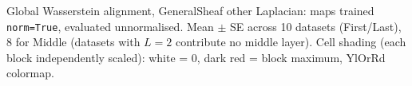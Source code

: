 \begin{table}[H]
\begin{minipage}{0.085\textwidth}
\end{minipage}
\caption{Global Wasserstein alignment, GeneralSheaf other Laplacian: maps trained \texttt{norm=True}, evaluated unnormalised. Mean $\pm$ SE across 10 datasets (First/Last), 8 for Middle (datasets with $L=2$ contribute no middle layer). Cell shading (each block independently scaled): white = 0, dark red = block maximum, YlOrRd colormap.}
\label{tab:global_general_other_unnorm}
\end{table}
